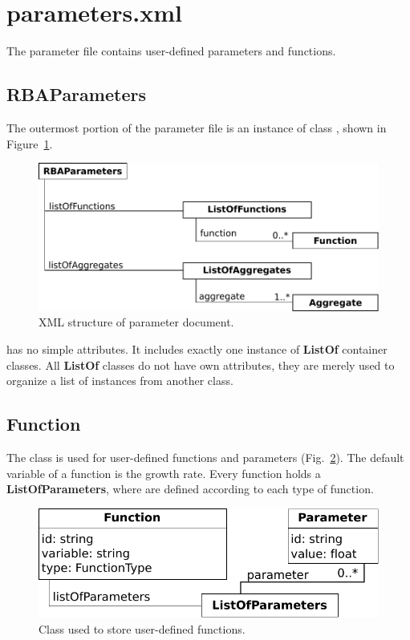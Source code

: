 
\section{parameters.xml}

The parameter file contains user-defined parameters and functions.


\subsection{RBAParameters}
\label{sec:rba_parameters}

The outermost portion of the parameter file is an instance of class
\rbaparameters, shown in Figure~\ref{fig:parameters_doc}.

\begin{figure}
  \centering
  \includegraphics[scale=0.8]{figures/parameters_doc}
  \caption{XML structure of parameter document.}
\label{fig:parameters_doc}
\end{figure}

\rbaparameters{} has no simple attributes.
It includes exactly one instance of \textbf{ListOf} container classes.
All \textbf{ListOf} classes do not have own attributes,
they are merely used to organize a list of instances from another class.

\subsection{Function}
\label{sec:function}

The \function{} class is used for user-defined functions and parameters
(Fig.~\ref{fig:parameters_function}).
The default variable of a function is the growth rate.
Every function holds a \textbf{ListOfParameters},
where \parameter{} are defined according to each type of function.

\begin{figure}
  \centering
  \includegraphics[scale=0.8]{figures/parameters_function}
  \caption{Class used to store user-defined functions.}
\label{fig:parameters_function}
\end{figure}

